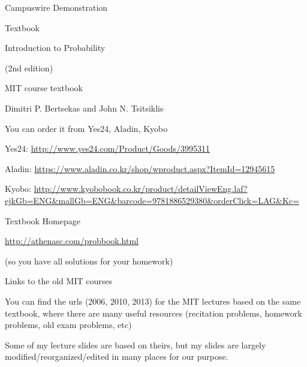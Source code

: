 \begin{frame}{Campuswire Demonstration}

 

\end{frame}
\begin{frame}{Textbook}

\plitemsep 0.02in

{
\bci
\item Introduction to Probability

(2nd edition)

\bci
\item MIT course textbook
\item Dimitri P. Bertsekas and John N. Tsitsiklis
\eci

\item You can order it from Yes24, Aladin, Kyobo
\bci
\item \scriptsize Yes24: \url{http://www.yes24.com/Product/Goods/3995311}
\item \scriptsize Aladin: \url{https://www.aladin.co.kr/shop/wproduct.aspx?ItemId=12945615}
\item \scriptsize Kyobo: \url{http://www.kyobobook.co.kr/product/detailViewEng.laf?ejkGb=ENG&mallGb=ENG&barcode=9781886529380&orderClick=LAG&Kc=}
\eci
  \eci
}
{
\centering
{}
}


\end{frame}


\begin{frame}{Textbook Homepage}

  \plitemsep 0.1in
  \bci

  \item<1-> \url{http://athenasc.com/probbook.html}

  \item<2->  (so you have all solutions for
    your homework) 

  \item<2-> Links to the old MIT courses

    \item<3-> You can find the urls (2006, 2010, 2013) for the MIT lectures
  based on the same textbook, where there are many useful resources
  (recitation problems, homework problems, old exam problems, etc)

\medskip
\item<4-> Some of my lecture slides are based on theirs, but my slides
   are largely  modified/reorganized/edited in many places for our
   purpose.

    \eci



\end{frame}

